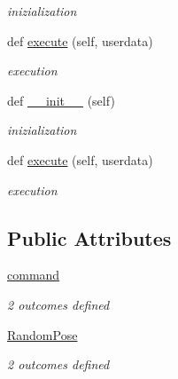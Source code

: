 \begin{DoxyCompactItemize}
\begin{DoxyCompactList}\small\item\em inizialization \end{DoxyCompactList}\item 
\mbox{\label{classstate__machine_1_1Normal_a2930df5f4890ec4b47b2a8e18f9bff08}} 
def \hyperlink{classstate__machine_1_1Normal_a2930df5f4890ec4b47b2a8e18f9bff08}{execute} (self, userdata)
\begin{DoxyCompactList}\small\item\em execution \end{DoxyCompactList}\item 
\mbox{\label{classstate__machine_1_1Normal_acdbc35a37d0350d7805a628048bc3bed}} 
def \hyperlink{classstate__machine_1_1Normal_acdbc35a37d0350d7805a628048bc3bed}{\+\_\+\+\_\+init\+\_\+\+\_\+} (self)
\begin{DoxyCompactList}\small\item\em inizialization \end{DoxyCompactList}\item 
\mbox{\label{classstate__machine_1_1Normal_a2930df5f4890ec4b47b2a8e18f9bff08}} 
def \hyperlink{classstate__machine_1_1Normal_a2930df5f4890ec4b47b2a8e18f9bff08}{execute} (self, userdata)
\begin{DoxyCompactList}\small\item\em execution \end{DoxyCompactList}\end{DoxyCompactItemize}
\subsection*{Public Attributes}
\begin{DoxyCompactItemize}
\item 
\hyperlink{classstate__machine_1_1Normal_af98201240ec5061a6b82b25758f6f207}{command}
\begin{DoxyCompactList}\small\item\em 2 outcomes defined \end{DoxyCompactList}\item 
\hyperlink{classstate__machine_1_1Normal_addf28bcb55a3e1f6bdb118850e164c03}{Random\+Pose}
\begin{DoxyCompactList}\small\item\em 2 outcomes defined \end{DoxyCompactList}\end{DoxyCompactItemize}


